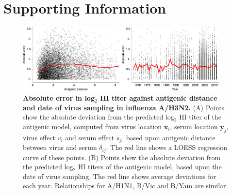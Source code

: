 \documentclass[11pt,oneside,letterpaper]{article}
\newcommand{\virus}{\mathbf{x}}						%
\newcommand{\serum}{\mathbf{y}}						%
\newcommand{\ve}{v}									%
\newcommand{\se}{s}									%
\begin{document}
\section*{Supporting Information}

\begin{figure}[H]
	\centering		
	\includegraphics[width=0.95\textwidth]{figures/error_by_distance_and_year}
	\caption{\textbf{Absolute error in log$_2$ HI titer against antigenic distance and date of virus sampling in influenza A/H3N2.} 
	(A) Points show the absolute deviation from the predicted log$_2$ HI titer of the antigenic model, computed from virus location $\virus_i$, serum location $\serum_j$, virus effect $\ve_i$ and serum effect $\se_j$, based upon antigenic distance between virus and serum $\delta_{ij}$.
	The red line shows a LOESS regression curve of these points.
	(B) Points show the absolute deviation from the predicted log$_2$ HI titers of the antigenic model, based upon the date of virus sampling.
	The red line shows average deviations for each year.
	Relationships for A/H1N1, B/Vic and B/Yam are similar.
	} 
	\label{error_by_distance_and_year} 
\end{figure}
\end{document}
